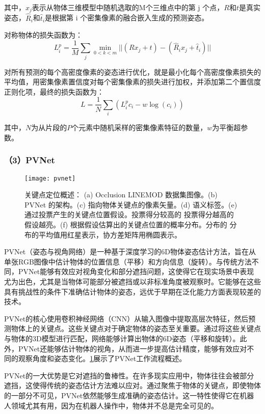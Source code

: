 其中，$x_{j}$表示从物体三维模型中随机选取的M个三维点中的第 j 个点，$R$和$t$是真实姿态，$\hat{R}_{i}$和$\hat{t}_{i}$是根据第 i 个密集像素的融合嵌入生成的预测姿态。

对称物体的损失函数为：
\begin{equation}
	\label{equ:denseFusion_2}
	L^{p}_{i} = \frac{1}{M}\sum\limits_{j}\min\limits_{0<k<m}||(Rx_{j} +t)-(\hat{R}_{i}x_{j} + \hat{t}_{i})||
\end{equation}

对所有预测的每个高密度像素的姿态进行优化，就是最小化每个高密度像素损失的平均值，用密集像素置信度对每个密集像素的损失进行加权，并添加第二个置信度正则化项，最终的损失函数为：
\begin{equation}
	\label{equ:denseFusion_3}
	L= \frac{1}{N}\sum\limits_{i}(L_{i}^{p}c_{i} - w\log(c_{i}))
\end{equation}

其中，$N$为从片段的$P$个元素中随机采样的密集像素特征的数量，$w$为平衡超参数。
\subsubsection*{（3）PVNet}
  \begin{figure}[htb]
	\texttt{[image: pvnet]}
	\caption[关键点定位概述]{关键点定位概述： (a) Occlusion LINEMOD 数据集图像。(b) PVNet 的架构。(c)
		指向物体关键点的像素矢量。(d) 语义标签。(e) 通过投票产生的关键点位置假设。投票得分较高的
		投票得分越高的假设越亮。(f) 根据假设估算出的关键点位置的概率分布。分布的
		分布的平均值用红星表示，协方差矩阵用椭圆表示。} %
	\label{fig:pvnet}
\end{figure}
PVNet（姿态与视角网络）是一种基于深度学习的6D物体姿态估计方法，旨在从单张RGB图像中估计物体的位置信息（平移）和方向信息（旋转）。与传统方法不同，PVNet能够有效应对视角变化和部分遮挡问题，这使得它在现实场景中表现尤为出色，尤其是当物体可能部分被遮挡或以非标准角度被观察时。它能够在这些具有挑战性的条件下准确估计物体的姿态，远优于早期在泛化能力方面表现较差的技术。

PVNet的核心使用卷积神经网络（CNN）从输入图像中提取高层次特征，然后预测物体上的关键点。这些关键点对于确定物体的姿态至关重要。通过将这些关键点与物体的3D模型进行匹配，网络能够计算出物体的6D姿态（平移和旋转）。此外，PVNet还能够估计物体的视角，从而进一步提高估计精度，能够有效应对不同的观察角度和姿态变化。\cref{fig:pvnet}展示了PVNet工作流程概述。

PVNet的一大优势是它对遮挡的鲁棒性。在许多现实应用中，物体往往会被部分遮挡，这使得传统的姿态估计方法难以应对。通过聚焦于物体的关键点，即使物体的一部分不可见，PVNet依然能够生成准确的姿态估计。这一特性使得它在机器人领域尤其有用，因为在机器人操作中，物体并不总是完全可见的。

